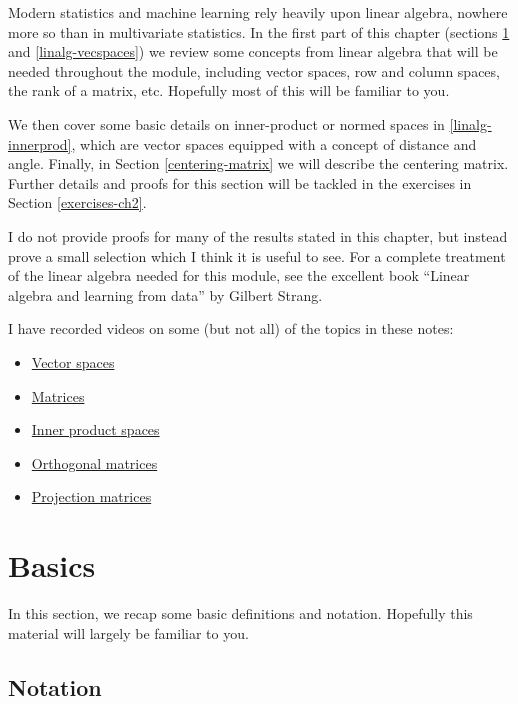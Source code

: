 \documentclass[
]{book}
\providecommand{\tightlist}{%
  \setlength{\itemsep}{0pt}\setlength{\parskip}{0pt}}
\theoremstyle{definition}
\theoremstyle{definition}
\theoremstyle{definition}
\theoremstyle{definition}
\theoremstyle{remark}
\begin{document}
Modern statistics and machine learning rely heavily upon linear algebra, nowhere more so than in multivariate statistics. In the first part of this chapter (sections \ref{linalg-basics} and \ref{linalg-vecspaces}) we review some concepts from linear algebra that will be needed throughout the module, including vector spaces, row and column spaces, the rank of a matrix, etc. Hopefully most of this will be familiar to you.

We then cover some basic details on inner-product or normed spaces in \ref{linalg-innerprod}, which are vector spaces equipped with a concept of distance and angle.
Finally, in Section \ref{centering-matrix} we will describe the centering matrix. Further details and proofs for this section will be tackled in the exercises in Section \ref{exercises-ch2}.

I do not provide proofs for many of the results stated in this chapter, but instead prove a small selection which I think it is useful to see. For a complete treatment of the linear algebra needed for this module, see the excellent book ``Linear algebra and learning from data'' by Gilbert Strang.

I have recorded videos on some (but not all) of the topics in these notes:

\begin{itemize}
\tightlist
\item
  \href{https://mediaspace.nottingham.ac.uk/media/Vector+Spaces/1_48xqrp04}{Vector spaces}
\item
  \href{https://mediaspace.nottingham.ac.uk/media/Matrices/1_nqo2u7zs}{Matrices}
\item
  \href{https://mediaspace.nottingham.ac.uk/media/Inner+Product+Spaces/1_nhcbybg3}{Inner product spaces}
\item
  \href{https://mediaspace.nottingham.ac.uk/media/Orthogonal+Matrices/1_rr2ervcs}{Orthogonal matrices}
\item
  \href{https://mediaspace.nottingham.ac.uk/media/Projection/1_soh726fg}{Projection matrices}
\end{itemize}

\section{Basics}\label{linalg-basics}

In this section, we recap some basic definitions and notation. Hopefully this material will largely be familiar to you.

\subsection{Notation}\label{notation-1}
\end{document}
